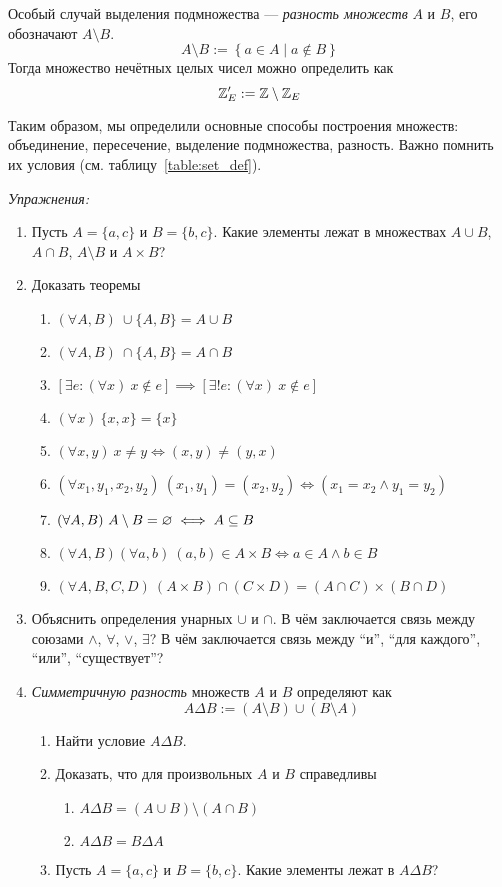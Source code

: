 Особый случай выделения подмножества --- {\it разность множеств} $A$ и $B$,
его обозначают $A\setminus B$.
\[
  A\setminus B:=\left\{a\in A\;\big|\; a\notin B\right\}
\]
Тогда множество нечётных целых чисел можно определить как
\[
  \mathbb Z'_{E}:=\mathbb Z\setminus \mathbb Z_E
\]


Таким образом, мы определили основные способы построения множеств:
объединение, пересечение, выделение подмножества, разность.
Важно помнить их условия (см. таблицу~\ref{table:set_def}).

\vspace{1em}
{\it Упражнения:}
\begin{enumerate}
  \item{}Пусть $A=\{a,c\}$ и $B=\{b,c\}$. Какие элементы лежат в множествах
  $A\cup B$, $A\cap B$, $A\setminus B$ и $A\times B$?
  \item{}Доказать теоремы
  \begin{enumerate}
    \item{}$(\forall A,B)~\cup \{A,B\}=A\cup B$
    \item{}$(\forall A,B)~\cap \{A,B\}=A\cap B$
    \item{}$[\exists e:(\forall x)~x\notin e]\implies
      [\exists!e:(\forall x)~x\notin e]$
    \item{}$(\forall x)~\{x,x\}=\{x\}$
    \item{}$(\forall x,y)~x\neq y\iff (x,y)\neq (y,x)$
    \item{}$(\forall x_1,y_1,x_2,y_2)~
      (x_1,y_1)=(x_2,y_2)\iff (x_1=x_2\land y_1=y_2)$
    \item{}$(\forall A,B)~A\setminus B=\varnothing\iff A\subseteq B$
    \item{}$(\forall A,B)(\forall a,b)~
      (a,b)\in A\times B\iff a\in A\land b\in B$
    \item{}$(\forall A,B,C,D)~
      (A\times B)\cap (C\times D)=(A\cap C)\times (B\cap D)$
  \end{enumerate}
  \item{}Объяснить определения унарных $\cup$ и $\cap$.
  В чём заключается связь между союзами $\land$, $\forall$, $\lor$, $\exists$?
  В чём заключается связь между ``и'', ``для каждого'', ``или'', ``существует''?
  \item{}{\it Симметричную разность}
  множеств $A$ и $B$ определяют как
  \[
    A\Delta B:=(A\setminus B)\cup (B\setminus A)
  \]
  \begin{enumerate}
    \item{}Найти условие $A\Delta B$.
    \item{}Доказать, что для произвольных $A$ и $B$ справедливы
    \begin{enumerate}
      \item{}$A\Delta B=(A\cup B)\setminus (A\cap B)$
      \item{}$A\Delta B=B\Delta A$
    \end{enumerate}
    \item{}Пусть $A=\{a,c\}$ и $B=\{b,c\}$. Какие элементы лежат в $A\Delta B$?
  \end{enumerate}
\end{enumerate}
